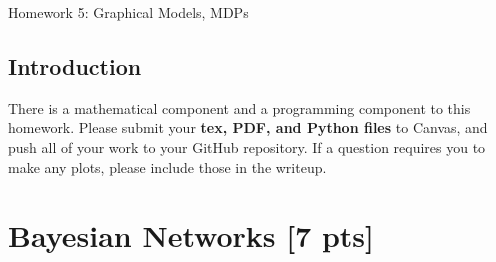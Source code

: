 \documentclass[submit]{harvardml}
\begin{document}
\begin{center}
{\Large Homework 5: Graphical Models, MDPs}\\
\end{center}

\subsection*{Introduction}

There is a mathematical component and a programming component to this homework.  Please submit your \textbf{tex, PDF, and Python files} to Canvas, 
and push all of your work to your GitHub repository. If a question requires you to make any plots, please include those in the writeup.

\newpage

\section*{Bayesian Networks [7 pts]} 
\end{document}
